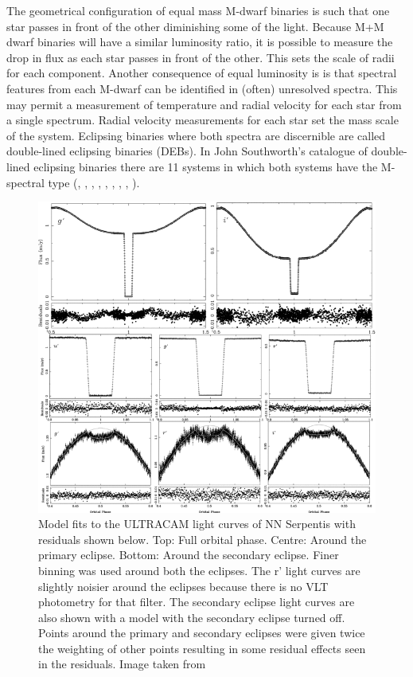 The geometrical configuration of equal mass M-dwarf binaries is such that one star passes in front of the other diminishing some of the light. Because M+M dwarf binaries will have a similar luminosity ratio, it is possible to measure the drop in flux as each star passes in front of the other. This sets the scale of radii for each component. Another consequence of equal luminosity is is that spectral features from each M-dwarf can be identified in (often) unresolved spectra. This may permit a measurement of temperature and radial velocity for each star from a single spectrum. Radial velocity measurements for each star set the mass scale of the system. Eclipsing binaries where both spectra are discernible are called double-lined eclipsing binaries (DEBs). In John Southworth's catalogue of double-lined eclipsing binaries \citep{2015ASPC..496..164S} there are 11 systems in which both systems have the M-spectral type (\citealt{2010ApJ...712.1003W}, \citealt{2002ApJ...567.1140T}, \citealt{2011ApJ...728...48K}, \citealt{2018AJ....155..114H}, \citealt{2003A&A...398..239R}, \citealt{2017ApJ...845...72K}, \citealt{2011ApJ...742..123I}, \citealt{2016ApJ...816...21D}, \citealt{2016ApJ...816...21D}). 



\begin{figure}
    \centering
    \includegraphics[scale=0.6]{3-images/WD+M.png}
    \caption{Model fits to the ULTRACAM light curves of NN Serpentis with residuals shown below. Top: Full orbital phase. Centre: Around the primary eclipse. Bottom: Around the secondary eclipse. Finer binning was used around both the eclipses. The r’ light curves are slightly noisier around the eclipses because there is no VLT photometry for that filter. The secondary eclipse light curves are also shown with a model with the secondary eclipse turned off. Points around the primary and secondary eclipses were given twice the weighting of other points resulting in some residual effects seen in the residuals. Image taken from \protect\citet{2010MNRAS.402.2591P}}
    \label{fig:WD_M_binary}
\end{figure}



